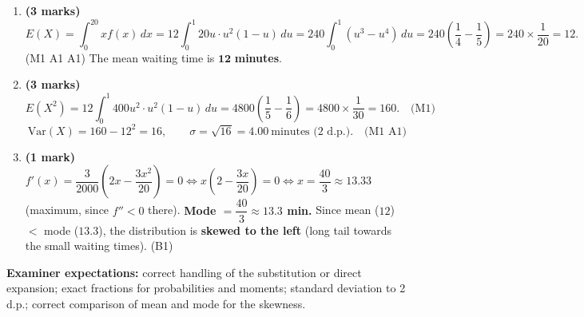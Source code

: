 \documentclass[11pt]{article}
\begin{document}
\begin{corrige}
\begin{enumerate}
\item \textbf{(3 marks)}
\[
E(X)=\int_0^{20}xf(x)\,dx=12\int_0^1 20u\cdot u^2(1-u)\,du=240\int_0^1(u^3-u^4)\,du=240\left(\frac14-\frac15\right)=240\times\frac1{20}=12.
\]
\hfill(M1 A1 A1) \quad The mean waiting time is $\mathbf{12}$ \textbf{minutes}.

\item \textbf{(3 marks)}
\[
E(X^2)=12\int_0^1 400u^2\cdot u^2(1-u)\,du=4800\left(\frac15-\frac16\right)=4800\times\frac1{30}=160. \quad\text{(M1)}
\]
\[
\mathrm{Var}(X)=160-12^2=16,\qquad \sigma=\sqrt{16}=4.00\ \text{minutes (2 d.p.)}. \quad\text{(M1 A1)}
\]

\item \textbf{(1 mark)} $f'(x)=\dfrac{3}{2000}\left(2x-\dfrac{3x^2}{20}\right)=0\iff x\left(2-\dfrac{3x}{20}\right)=0\iff x=\dfrac{40}{3}\approx 13.33$ (maximum, since $f''<0$ there). \textbf{Mode $=\dfrac{40}{3}\approx 13.3$ min.} Since mean ($12$) $<$ mode ($13.3$), the distribution is \textbf{skewed to the left} (long tail towards the small waiting times). \hfill(B1)
\end{enumerate}
\textbf{Examiner expectations:} correct handling of the substitution or direct expansion; exact fractions for probabilities and moments; standard deviation to 2 d.p.; correct comparison of mean and mode for the skewness.
\end{corrige}
\end{document}
